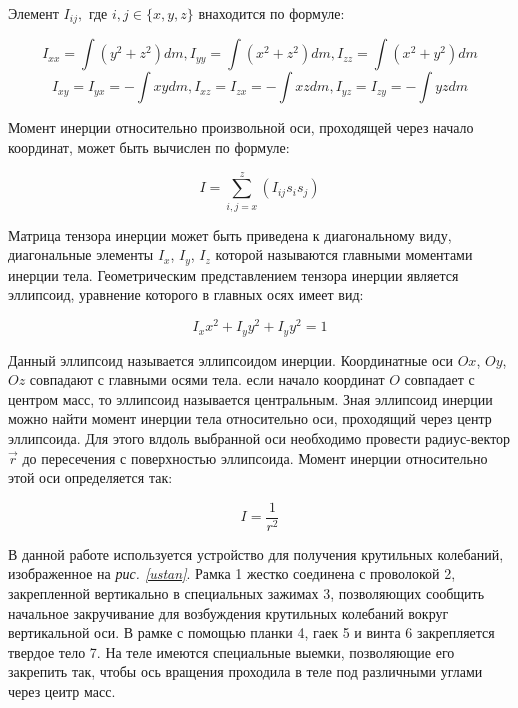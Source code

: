 \documentclass[a4paper, 12pt]{article}
\begin{document}
Элемент $I_{ij}, \text{ где } i,j \in \{ x, y, z \}$ внаходится по формуле:

\begin{equation}\label{xx}
    I_{xx} = \int \left(y^2 + z^2 \right) dm, I_{yy} = \int \left(x^2 + z^2 \right) dm, I_{zz} = \int \left(x^2 + y^2 \right) dm
\end{equation}
\begin{equation}
    I_{xy} = I_{yx} = - \int xy dm, I_{xz} = I_{zx} = - \int xz dm, I_{yz} = I_{zy} = - \int yz dm
\end{equation}

Момент инерции относительно произвольной оси, проходящей через начало координат, может быть вычислен по формуле:
 
\begin{equation}
    I = \sum_{i,j=x}^{z} \left( I_{ij} s_{i} s_{j} \right)
\end{equation}

Матрица тензора инерции может быть приведена к диагональному виду, диагональные элементы $I_{x}$, $I_{y}$, $I_{z}$ которой называются главными моментами инерции тела. Геометрическим представлением тензора инерции является эллипсоид, уравнение которого в главных осях имеет вид:

\begin{equation}
    I_{x} x^2 + I_{y} y^2 + I_{y} y^2 = 1
\end{equation}

Данный эллипсоид называется эллипсоидом инерции. Координатные оси $Ox$, $Oy$, $Oz$ совпадают с главными осями тела. если начало координат $O$ совпадает с центром масс, то эллипсоид называется центральным. Зная эллипсоид инерции можно найти момент инерции тела относительно оси, проходящий через центр эллипсоида. Для этого влдоль выбранной оси необходимо провести радиус-вектор $\vec{r}$ до пересечения с поверхностью эллипсоида. Момент инерции относительно этой оси определяется так:

\begin{equation}
    I = \frac{1}{r^2}
\end{equation}

В данной работе используется устройство для получения крутильных колебаний, изображенное на \textit{рис.  \ref{ustan}}. Рамка 1 жестко соединена с проволокой 2, закрепленной вертикально в специальных зажимах 3, позволяющих сообщить начальное закручивание для возбуждения крутильных колебаний вокруг вертикальной оси. В рамке с помощью планки 4, гаек 5 и винта 6 закрепляется твердое тело 7. На теле имеются специальные выемки, позволяющие его закрепить так, чтобы ось вращения проходила в теле под различными углами через цеитр масс.
\end{document}
